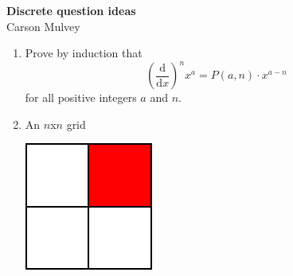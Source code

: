 \documentclass[11pt,letterpaper]{article}
\begin{document}
\begin{center}
    \begin{large}
        \textbf{Discrete question ideas} \\
        Carson Mulvey
    \end{large}
\end{center}

\begin{enumerate}
\item Prove by induction that
\[
    \displaystyle \left({\frac {\mathrm {d} }{\mathrm {d} x}}\right)^{n}x^{a}=P(a,n)\cdot x^{a-n}
\]
for all positive integers $a$ and $n$.

\item An $n$x$n$ grid

\includegraphics{diagram}

\end{enumerate}
\end{document}
